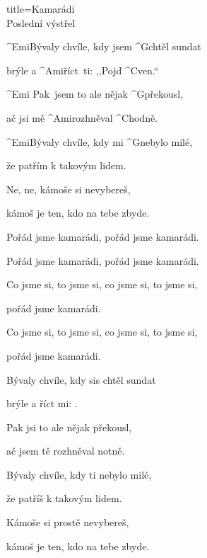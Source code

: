\begin{song}{title=\predtitle\centering Kamarádi \\\large Poslední výstřel  \vspace*{-0.3cm}}  %
\begin{centerjustified}
\nejnejvetsi

\sloka
	^{Emi}Bývaly chvíle, kdy jsem ^{G}chtěl sundat

	brýle a ^{Ami\z}říct~ti: ,,Pojď ^{C}ven.``

	^{Emi \z}Pak~jsem to ale nějak ^{G\z}překousl,

	ač jsi mě ^{Ami\z}rozhněval ^{\z C}hodně.

\sloka
	^{Emi\z}Bývaly chvíle, kdy mi ^{G}nebylo milé,

	že patřím k takovým lidem.

	Ne, ne, kámoše si nevybereš,

	kámoš je ten, kdo na tebe zbyde.

	Pořád jsme kamarádi, pořád jsme kamarádi.

	Pořád jsme kamarádi, pořád jsme kamarádi.

	Co jsme si, to jsme si, co jsme si, to jsme si,

	pořád jsme kamarádi.

	Co jsme si, to jsme si, co jsme si, to jsme si,

	pořád jsme kamarádi.

\sloka
	Bývaly chvíle, kdy sis chtěl sundat

	brýle a říct mi: .

	Pak jsi to ale nějak překousl,

	ač jsem tě rozhněval notně.

\sloka
	Bývaly chvíle, kdy ti nebylo milé,

	že patříš k takovým lidem.

	Kámoše si prostě nevybereš,

	kámoš je ten, kdo na tebe zbyde.


\end{centerjustified}
\setcounter{Slokočet}{0}
\end{song}
